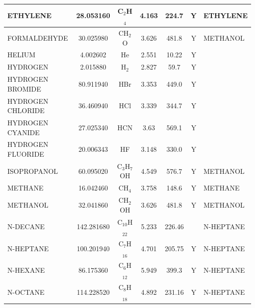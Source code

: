\documentclass[11pt]{book}
\begin{document}
\begin{table}[p]
\begin{center}
\begin{tabular}{|l|c|c|c|c|c|l|}
{\ct ETHYLENE}           & 28.053160  & C$_2$H$_4$       & 4.163    & 224.7    &  Y       &  {\ct ETHYLENE}                 \\ \hline
{\ct FORMALDEHYDE}       & 30.025980  & CH$_2$O          & 3.626    & 481.8    &  Y       &  {\ct METHANOL}                 \\ \hline
{\ct HELIUM}             & 4.002602   & He               & 2.551    & 10.22    &  Y       &                                 \\ \hline
{\ct HYDROGEN}           & 2.015880   & H$_2$            & 2.827    & 59.7     &  Y       &                                 \\ \hline
{\ct HYDROGEN BROMIDE}   & 80.911940  & HBr              & 3.353    & 449.0    &  Y       &                                 \\ \hline
{\ct HYDROGEN CHLORIDE}  & 36.460940  & HCl              & 3.339    & 344.7    &  Y       &                                 \\ \hline
{\ct HYDROGEN CYANIDE}   & 27.025340  & HCN              & 3.63     & 569.1    &  Y       &                                 \\ \hline
{\ct HYDROGEN FLUORIDE}  & 20.006343  & HF               & 3.148    & 330.0    &  Y       &                                 \\ \hline
{\ct ISOPROPANOL}        & 60.095020  & C$_3$H$_7$OH     & 4.549    & 576.7    &  Y       &  {\ct METHANOL}                 \\ \hline
{\ct METHANE}            & 16.042460  & CH$_4$           & 3.758    & 148.6    &  Y       &  {\ct METHANE}                  \\ \hline
{\ct METHANOL}           & 32.041860  & CH$_2$OH         & 3.626    & 481.8    &  Y       &  {\ct METHANOL}                 \\ \hline
{\ct N-DECANE}           & 142.281680 & C$_{10}$H$_{22}$ & 5.233    & 226.46   &          &  {\ct N-HEPTANE}                \\ \hline
{\ct N-HEPTANE}          & 100.201940 & C$_7$H$_{16}$    & 4.701    & 205.75   &  Y       &  {\ct N-HEPTANE}                \\ \hline
{\ct N-HEXANE}           & 86.175360  & C$_6$H$_{12}$    & 5.949    & 399.3    &  Y       &  {\ct N-HEPTANE}                \\ \hline
{\ct N-OCTANE}           & 114.228520 & C$_8$H$_{18}$    & 4.892    & 231.16   &  Y       &  {\ct N-HEPTANE}                \\ \hline

\end{tabular}
\end{center}
\end{table}
\end{document}
